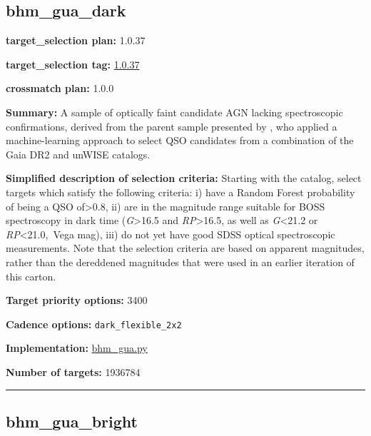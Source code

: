 \hypertarget{bhm_gua_dark_plan1.0.37}{%
\subsection{bhm\_gua\_dark}\label{bhm_gua_dark_plan1.0.37}}

\noindent\textbf{target\_selection plan:} 1.0.37

\noindent\textbf{target\_selection tag:}
\href{https://github.com/sdss/target_selection/tree/1.0.37/}{1.0.37}

\noindent\textbf{crossmatch plan:} 1.0.0

\noindent\textbf{Summary:} A sample of optically faint candidate AGN lacking
spectroscopic confirmations, derived from the parent sample presented by
\citet{Shu2019}, who applied a machine-learning approach to select QSO
candidates from a combination of the Gaia DR2 and unWISE catalogs.

\noindent\textbf{Simplified description of selection criteria:} Starting with the
\citet{Shu2019} catalog, select targets which satisfy the following
criteria: i) have a Random Forest probability of being a QSO
of\textgreater0.8, ii) are in the magnitude range suitable for BOSS
spectroscopy in dark time (\emph{G}\textgreater16.5 and
\emph{RP}\textgreater16.5, as well as \emph{G}\textless21.2 or
\emph{RP}\textless21.0,~Vega mag), iii) do not yet have good SDSS
optical spectroscopic measurements. Note that the selection criteria are
based on apparent magnitudes, rather than the dereddened magnitudes that
were used in an earlier iteration of this carton.


\noindent\textbf{Target priority options:} 3400

\noindent\textbf{Cadence options:} \texttt{dark\_flexible\_2x2}

\noindent\textbf{Implementation:}
\href{https://github.com/sdss/target_selection/blob/1.0.37/python/target_selection/cartons/bhm_gua.py}{bhm\_gua.py}

\noindent\textbf{Number of targets:} 1936784

\begin{center}\rule{0.5\linewidth}{0.5pt}\end{center}

\hypertarget{bhm_gua_bright_plan1.0.37}{%
\subsection{bhm\_gua\_bright}\label{bhm_gua_bright_plan1.0.37}}

